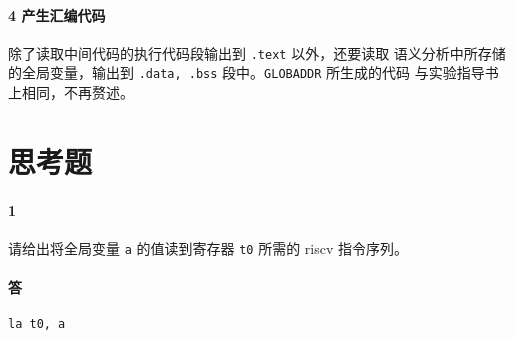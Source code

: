 \documentclass[UTF8]{ctexart}
\newcommand{\T}[1]{\texttt{{#1}}}
\begin{document}
            \paragraph{4 产生汇编代码} 除了读取中间代码的执行代码段输出到 \T{.text} 以外，还要读取
            语义分析中所存储的全局变量，输出到 \T{.data, .bss} 段中。\T{GLOBADDR} 所生成的代码
            与实验指导书上相同，不再赘述。
        
    \section{思考题}
        \paragraph{1} 请给出将全局变量 \T{a} 的值读到寄存器 \T{t0} 所需的 riscv 指令序列。
        \paragraph{答} \T{la t0, a}
\end{document}
